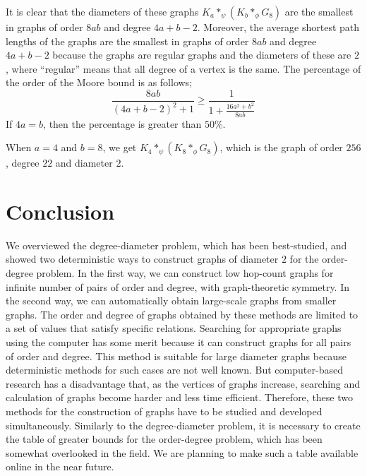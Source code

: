 \documentclass[conference]{IEEEtran}
\begin{document}
It is clear that the diameters of these graphs $K_a *_\psi (K_b *_\phi G_8)$ are the smallest in graphs of order $8ab$ and degree $4a+b-2$.
Moreover, the average shortest path lengths of the graphs are the smallest in graphs of order $8ab$ and degree $4a+b-2$ because the graphs are regular graphs and the diameters of these are $2$,
where ``regular'' means that all degree of a vertex is the same.
The percentage of the order of the Moore bound is as follows;
\[ \frac{8ab}{(4a+b-2)^2+1} \geq \frac{1}{1+\frac{16a^2+b^2}{8ab}} \]
If $4a=b$, then the percentage is greater than $50$\%. 

When $a=4$ and $b=8$, we get $K_4 *_\psi (K_8 *_\phi G_8)$, which is the graph of order $256$, degree $22$ and diameter $2$.


\section{Conclusion}
We overviewed the degree-diameter problem, which has been best-studied,
and showed two deterministic ways to construct graphs of diameter $2$ for the order-degree problem.
In the first way, we can construct low hop-count graphs for infinite number of pairs of order and degree, with graph-theoretic symmetry.
In the second way, we can automatically obtain large-scale graphs from smaller graphs. 
The order and degree of graphs obtained by these methods are limited to a set of values that satisfy specific relations.
Searching for appropriate graphs using the computer has some merit because it can construct graphs for all pairs of order and degree.
This method is suitable for large diameter graphs because deterministic methods for such cases are not well known.
But computer-based research has a disadvantage that, as the vertices of graphs increase,
searching and calculation of graphs become harder and less time efficient.
Therefore, these two methods for the construction of graphs have to be studied and developed simultaneously.
Similarly to the degree-diameter problem, it is necessary to create the table of greater bounds for the order-degree problem,
which has been somewhat overlooked in the field.
We are planning to make such a table available online in the near future.
\end{document}
